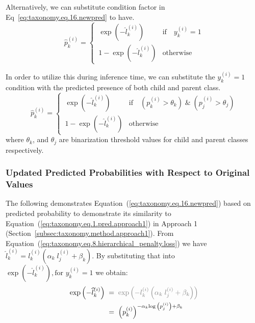 \documentclass[review,1p,times,numbers]{elsarticle}
\begin{document}
Alternatively, we can substitute condition factor in Eq~\ref{eq:taxonomy.eq.16.newpred} to have.
\begin{equation}
    \label{eq:taxonomy.loss.newpred_based_on_loss}
    \widehat{p}_k^{(i)} =
    \begin{cases}
        \, \exp(-\widehat{l}_k^{(i)})
        &
        \text{if} \quad y_{k}^{(i)}=1
        \\
        \, 1 - \exp(-\widehat{l}_k^{(i)})
        &
        \text{otherwise}
    \end{cases}
\end{equation}

In order to utilize this during inference time, we can substitute the $y_{k}^{(i)}=1$ condition with the predicted presence of both child and parent class.
\begin{equation}
    \label{eq:taxonomy.loss.newpred_based_on_loss_inference}
    \widehat{p}_k^{(i)} =
    \begin{cases}
        \, \exp(-\widehat{l}_k^{(i)})
        &
        \text{if} \quad (p_k^{(i)} > \theta_k) \; \& \; (p_j^{(i)} > \theta_j)
        \\
        \, 1 - \exp(-\widehat{l}_k^{(i)})
        &
        \text{otherwise}
    \end{cases}
\end{equation}
where $\theta_k$, and $\theta_j$ are binarization threshold values for child and parent classes respectively.

\subsubsection{Updated Predicted Probabilities with Respect to Original Values}
The following demonstrates Equation~(\ref{eq:taxonomy.eq.16.newpred}) based on predicted probability to demonstrate its similarity to Equation~(\ref{eq:taxonomy.eq.1.pred.approach1}) in Approach 1 (Section~\ref{subsec:taxonomy.method.approach1}). From Equation~(\ref{eq:taxonomy.eq.8.hierarchical_penalty.loss}) we have $\hat{l}_k^{(i)}=l_k^{(i)}\left(\alpha_k\;l_j^{(i)}+\beta_k\right) $. By substituting that into $\exp{\left(-\widehat{l}_{k}^{(i)}\right)}, \text{for } y_{k}^{(i)}=1 $ we obtain:
\begin{align}
    \label{eq:taxonomy.eq.17}
    \exp{\left(-{\widehat l}_k^{(i)}\right)}
    & \; = \; \textcolor{gray}{\exp{\left(-l_k^{(i)}\left(\alpha_k \; l_j^{(i)}+\beta_k\right)\right)}}
    \\
    & \; = \; {\left(p_k^{(i)}\right)}^{-\alpha_k{\log{\left(p_j^{(i)}\right)}}+\beta_k}
\end{align}
\end{document}
